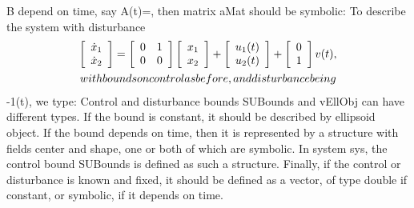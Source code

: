 \documentclass[letterpaper,10pt,english]{sphinxmanual}
\begin{document}
B depend on time, say A(t)=, then matrix aMat should be
symbolic: To describe the system with disturbance
\begin{gather}
\begin{split}  \left[\begin{array}{cc}
  \dot{x}_1\\
  \dot{x}_2\end{array}\right] = \left[\begin{array}{cc}
  0 & 1\\
  0 & 0\end{array}\right]\left[\begin{array}{c}
  x_1\\
  x_2\end{array}\right] + \left[\begin{array}{c}
  u_1(t)\\
  u_2(t)\end{array}\right] + \left[\begin{array}{c}
  0\\
  1\end{array}\right]v(t),\end{split}\notag\\\begin{split}with bounds on control as before, and disturbance being\end{split}\notag
\end{gather}
-1\leqslantv(t), we type: Control and disturbance
bounds SUBounds and vEllObj can have different types. If the bound is
constant, it should be described by ellipsoid object. If the bound
depends on time, then it is represented by a structure with fields
center and shape, one or both of which are symbolic. In system sys, the
control bound SUBounds is defined as such a structure. Finally, if the
control or disturbance is known and fixed, it should be defined as a
vector, of type double if constant, or symbolic, if it depends on time.
\end{document}
